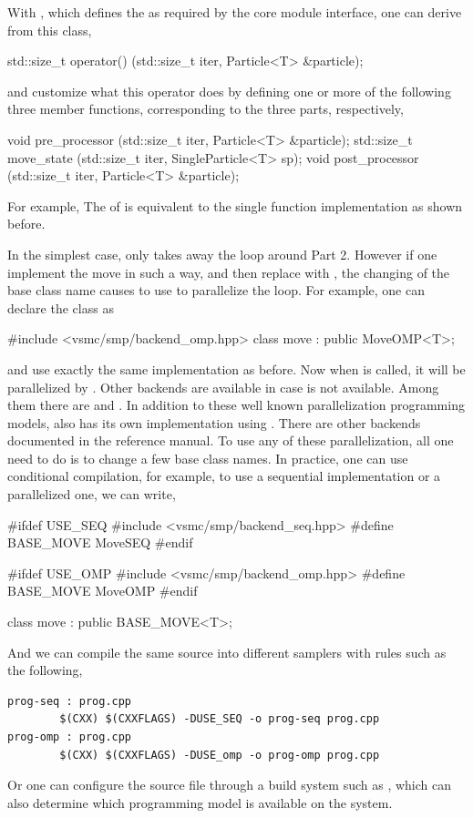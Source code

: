 With , which defines the  as required by the
core module interface, one can derive from this class,
\begin{cppcode}
std::size_t operator() (std::size_t iter, Particle<T> &particle);
\end{cppcode}
and customize what this operator does by defining one or more of the following
three member functions, corresponding to the three parts, respectively,
\begin{cppcode}
void pre_processor (std::size_t iter, Particle<T> &particle);
std::size_t move_state (std::size_t iter, SingleParticle<T> sp);
void post_processor (std::size_t iter, Particle<T> &particle);
\end{cppcode}
For example,
The  of  is equivalent to the single
function implementation as shown before.

In the simplest case,  only takes away the loop around Part 2.
However if one implement the move in such a way, and then replace
 with , the changing of the base class name causes
\vsmc to use \openmp to parallelize the loop. For example, one can declare the
class as
\begin{cppcode}
#include <vsmc/smp/backend_omp.hpp>
class move : public MoveOMP<T>;
\end{cppcode}
and use exactly the same implementation as before. Now when
 is called, it will be parallelized by \openmp. Other
backends are available in case \openmp is not available. Among them there are
\cilk and \tbb. In addition to these well known parallelization programming
models, \vsmc also has its own implementation using \cppoo{} .
There are other backends documented in the reference manual. To use any of
these parallelization, all one need to do is to change a few base class names.
In practice, one can use conditional compilation, for example, to use a
sequential implementation or a \openmp parallelized one, we can write,
\begin{cppcode}
#ifdef USE_SEQ
#include <vsmc/smp/backend_seq.hpp>
#define BASE_MOVE MoveSEQ
#endif

#ifdef USE_OMP
#include <vsmc/smp/backend_omp.hpp>
#define BASE_MOVE MoveOMP
#endif

class move : public BASE_MOVE<T>;
\end{cppcode}
And we can compile the same source into different samplers with
 rules such as the following,
\begin{verbatim}
prog-seq : prog.cpp
        $(CXX) $(CXXFLAGS) -DUSE_SEQ -o prog-seq prog.cpp
prog-omp : prog.cpp
        $(CXX) $(CXXFLAGS) -DUSE_omp -o prog-omp prog.cpp
\end{verbatim}
Or one can configure the source file through a build system such as \cmake,
which can also determine which programming model is available on the system.

